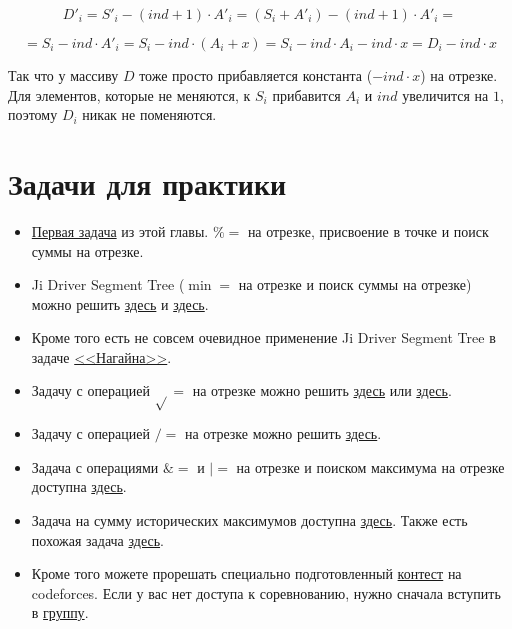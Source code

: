 $$D'_i = S'_i - (ind + 1) \cdot A'_i = (S_i + A'_i) - (ind + 1) \cdot A'_i=$$

$$= S_i - ind \cdot A'_i = S_i - ind \cdot (A_i + x) = S_i - ind \cdot A_i - ind \cdot x = D_i - ind \cdot x$$

Так что у массиву $D$ тоже просто прибавляется константа ($-ind \cdot x$) на отрезке. Для элементов, которые не меняются, к $S_i$ прибавится $A_i$ и $ind$ увеличится на $1$, поэтому $D_i$ никак не поменяются.



\section{Задачи для практики}

\begin{itemize}
 
    \item \href{https://codeforces.com/contest/438/problem/D}{Первая задача} из этой главы. $\%=$ на отрезке, присвоение в точке и поиск суммы на отрезке.

    \item Ji Driver Segment Tree ($\min=$ на отрезке и поиск суммы на отрезке) можно решить \href{https://vjudge.net/problem/HDU-5306}{здесь} и \href{http://acm.hdu.edu.cn/showproblem.php?pid=5306}{здесь}.

    \item Кроме того есть не совсем очевидное применение Ji Driver Segment Tree в задаче \href{https://codeforces.com/problemset/problem/855/F}{<<Нагайна>>}.

    \item Задачу с операцией $\sqrt{}=$ на отрезке можно решить \href{https://vjudge.net/problem/HDU-5828}{здесь} или \href{http://acm.hdu.edu.cn/showproblem.php?pid=5828}{здесь}.

    \item Задачу с операцией $/=$ на отрезке можно решить \href{https://www.hackerrank.com/challenges/box-operations/problem}{здесь}.

    \item Задача с операциями $\&=$ и $|=$ на отрезке и поиском максимума на отрезке доступна \href{https://csacademy.com/contest/round-70/task/and-or-max/}{здесь}.

    \item Задача на сумму исторических максимумов доступна \href{https://uoj.ac/problem/169}{здесь}. Также есть похожая задача \href{https://www.luogu.com.cn/problem/P4314}{здесь}.

    \item Кроме того можете прорешать специально подготовленный \href{https://codeforces.com/group/1rv4rhCsHp/contest/327313}{контест} на codeforces. Если у вас нет доступа к соревнованию, нужно сначала вступить в \href{https://codeforces.com/group/1rv4rhCsHp/contests}{группу}.
\end{itemize}

